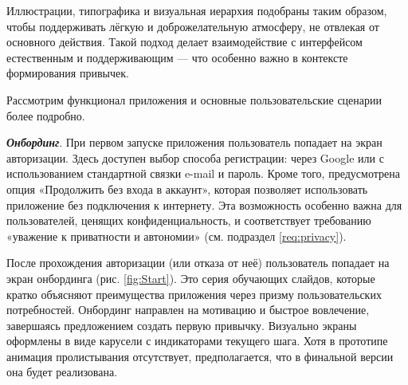 \documentclass[pdflatex,sn-mathphys-num]{sn-jnl}%
\theoremstyle{thmstyleone}%
\theoremstyle{thmstyletwo}%
\theoremstyle{thmstylethree}%
\begin{document}
Иллюстрации, типографика и визуальная иерархия подобраны таким образом, чтобы поддерживать лёгкую и доброжелательную атмосферу, не отвлекая от основного действия. Такой подход делает взаимодействие с интерфейсом естественным и поддерживающим — что особенно важно в контексте формирования привычек.

Рассмотрим функционал приложения и основные пользовательские сценарии более подробно.

\medskip

\textbf{\textit{Онбординг}}. При первом запуске приложения пользователь попадает на экран авторизации. Здесь доступен выбор способа регистрации: через Google или с использованием стандартной связки e-mail и пароль. Кроме того, предусмотрена опция «Продолжить без входа в аккаунт», которая позволяет использовать приложение без подключения к интернету. Эта возможность особенно важна для пользователей, ценящих конфиденциальность, и соответствует требованию «уважение к приватности и автономии» (см. подраздел \ref{req:privacy}).

После прохождения авторизации (или отказа от неё) пользователь попадает на экран онбординга (рис. \ref{fig:Start}). Это серия обучающих слайдов, которые кратко объясняют преимущества приложения через призму пользовательских потребностей. Онбординг направлен на мотивацию и быстрое вовлечение, завершаясь предложением создать первую привычку. Визуально экраны оформлены в виде карусели с индикаторами текущего шага. Хотя в прототипе анимация пролистывания отсутствует, предполагается, что в финальной версии она будет реализована.
\end{document}
